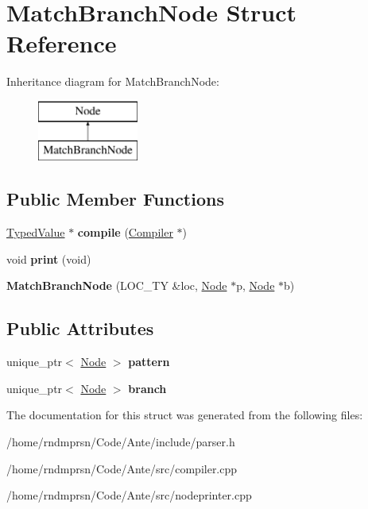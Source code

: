 \hypertarget{structMatchBranchNode}{}\section{Match\+Branch\+Node Struct Reference}
\label{structMatchBranchNode}
Inheritance diagram for Match\+Branch\+Node\+:\begin{figure}[H]
\begin{center}
\leavevmode
\includegraphics[height=2.000000cm]{structMatchBranchNode}
\end{center}
\end{figure}
\subsection*{Public Member Functions}
\begin{DoxyCompactItemize}
\item 
\mbox{\label{structMatchBranchNode_a6d0e0debc917abde7592c6478e05af94}} 
\hyperlink{structTypedValue}{Typed\+Value} $\ast$ {\bfseries compile} (\hyperlink{structante_1_1Compiler}{Compiler} $\ast$)
\item 
\mbox{\label{structMatchBranchNode_a05af1b7df2d7dc0e8f2fb215d3cbf63f}} 
void {\bfseries print} (void)
\item 
\mbox{\label{structMatchBranchNode_a1847940743f41b5fc3ff79fb868cfbe0}} 
{\bfseries Match\+Branch\+Node} (L\+O\+C\+\_\+\+TY \&loc, \hyperlink{structNode}{Node} $\ast$p, \hyperlink{structNode}{Node} $\ast$b)
\end{DoxyCompactItemize}
\subsection*{Public Attributes}
\begin{DoxyCompactItemize}
\item 
\mbox{\label{structMatchBranchNode_a861fa4fd6f054761086563c4503bfecd}} 
unique\+\_\+ptr$<$ \hyperlink{structNode}{Node} $>$ {\bfseries pattern}
\item 
\mbox{\label{structMatchBranchNode_a0d5c93f50235b20bb49388f77d3f03eb}} 
unique\+\_\+ptr$<$ \hyperlink{structNode}{Node} $>$ {\bfseries branch}
\end{DoxyCompactItemize}


The documentation for this struct was generated from the following files\+:\begin{DoxyCompactItemize}
\item 
/home/rndmprsn/\+Code/\+Ante/include/parser.\+h\item 
/home/rndmprsn/\+Code/\+Ante/src/compiler.\+cpp\item 
/home/rndmprsn/\+Code/\+Ante/src/nodeprinter.\+cpp\end{DoxyCompactItemize}
